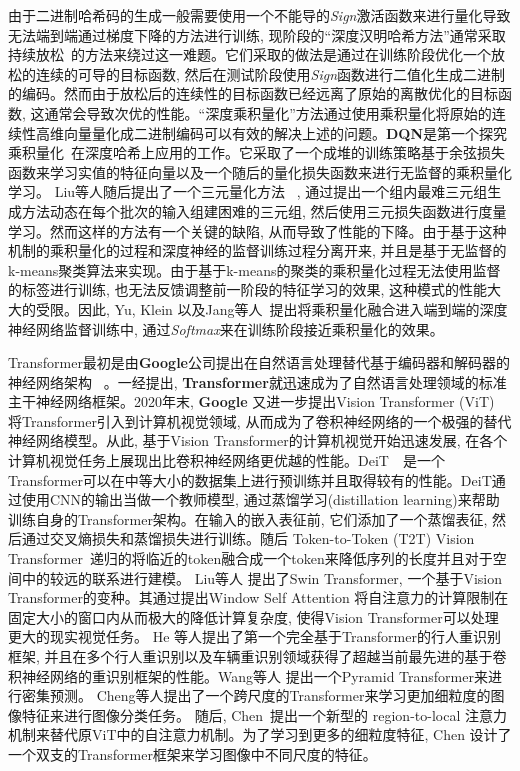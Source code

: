 由于二进制哈希码的生成一般需要使用一个不能导的\textit{Sign}激活函数来进行量化导致无法端到端通过梯度下降的方法进行训练, 现阶段的``深度汉明哈希方法''通常采取持续放松~\cite{liu2016deep}的方法来绕过这一难题。它们采取的做法是通过在训练阶段优化一个放松的连续的可导的目标函数, 然后在测试阶段使用\textit{Sign}函数进行二值化生成二进制的编码。然而由于放松后的连续性的目标函数已经远离了原始的离散优化的目标函数, 这通常会导致次优的性能。``深度乘积量化''方法通过使用乘积量化将原始的连续性高维向量量化成二进制编码可以有效的解决上述的问题。\textbf{DQN}\cite{yue2016deep}是第一个探究乘积量化~\cite{jegou2010product,ge2013optimized,zhang2014composite}在深度哈希上应用的工作。它采取了一个成堆的训练策略基于余弦损失函数来学习实值的特征向量以及一个随后的量化损失函数来进行无监督的乘积量化学习。 Liu等人随后提出了一个三元量化方法~ \cite{liu2018deep}, 通过提出一个组内最难三元组生成方法动态在每个批次的输入组建困难的三元组, 然后使用三元损失函数进行度量学习。然而这样的方法有一个关键的缺陷, 从而导致了性能的下降。由于基于这种机制的乘积量化的过程和深度神经的监督训练过程分离开来, 并且是基于无监督的k-means聚类算法来实现。由于基于k-means的聚类的乘积量化过程无法使用监督的标签进行训练, 也无法反馈调整前一阶段的特征学习的效果, 这种模式的性能大大的受限。因此, Yu, Klein 以及Jang等人~\cite{yu2018product, klein2019end,jang2020generalized}提出将乘积量化融合进入端到端的深度神经网络监督训练中, 通过\textit{Softmax}来在训练阶段接近乘积量化的效果。\par
Transformer最初是由\textbf{Google}公司提出在自然语言处理替代基于编码器和解码器的神经网络架构~\cite{vaswani2017attention} 。一经提出, \textbf{Transformer}就迅速成为了自然语言处理领域的标准主干神经网络框架。2020年末, \textbf{Google} 又进一步提出Vision Transformer (ViT) 将Transformer引入到计算机视觉领域, 从而成为了卷积神经网络的一个极强的替代神经网络模型。从此, 基于Vision Transformer的计算机视觉开始迅速发展, 在各个计算机视觉任务上展现出比卷积神经网络更优越的性能。DeiT~\cite{touvron2021training}~是一个Transformer可以在中等大小的数据集上进行预训练并且取得较有的性能。DeiT通过使用CNN的输出当做一个教师模型, 通过蒸馏学习(distillation learning)来帮助训练自身的Transformer架构。在输入的嵌入表征前, 它们添加了一个蒸馏表征, 然后通过交叉熵损失和蒸馏损失进行训练。随后 Token-to-Token (T2T) Vision Transformer~\cite{yuan2021tokens}递归的将临近的token融合成一个token来降低序列的长度并且对于空间中的较远的联系进行建模。 Liu等人\cite{liu2021swin} 提出了Swin Transformer, 一个基于Vision Transformer的变种。其通过提出Window Self Attention 将自注意力的计算限制在固定大小的窗口内从而极大的降低计算复杂度, 使得Vision Transformer可以处理更大的现实视觉任务。 He 等人\cite{he2021transreid}提出了第一个完全基于Transformer的行人重识别框架, 并且在多个行人重识别以及车辆重识别领域获得了超越当前最先进的基于卷积神经网络的重识别框架的性能。Wang等人 \cite{wang2021pyramid}提出一个Pyramid Transformer来进行密集预测。 Cheng等人\cite{wang2021crossformer}提出了一个跨尺度的Transformer来学习更加细粒度的图像特征来进行图像分类任务。 随后, Chen~\cite{chen2021regionvit}提出一个新型的 region-to-local 注意力机制来替代原ViT中的自注意力机制。为了学习到更多的细粒度特征, Chen\cite{chen2021crossvit} 设计了一个双支的Transformer框架来学习图像中不同尺度的特征。\par
